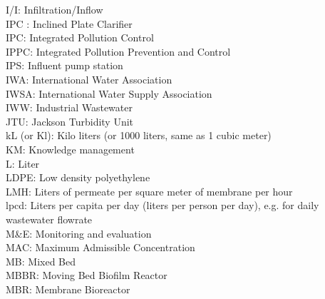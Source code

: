 \documentclass{article}
\begin{document}
I/I:  Infiltration/Inflow
\vspace{0.3cm}\\
IPC :  Inclined Plate Clarifier
\vspace{0.3cm}\\
IPC:  Integrated Pollution Control
\vspace{0.3cm}\\
IPPC:  Integrated Pollution Prevention and Control
\vspace{0.3cm}\\
IPS:  Influent pump station
\vspace{0.3cm}\\
IWA:  International Water Association
\vspace{0.3cm}\\
IWSA:  International Water Supply Association
\vspace{0.3cm}\\
IWW:  Industrial Wastewater
\vspace{0.3cm}\\
JTU:  Jackson Turbidity Unit
\vspace{0.3cm}\\
kL (or Kl):  Kilo liters (or 1000 liters, same as 1 cubic meter)
\vspace{0.3cm}\\
KM:  Knowledge management
\vspace{0.3cm}\\
L:  Liter
\vspace{0.3cm}\\
LDPE:  Low density polyethylene
\vspace{0.3cm}\\
LMH:  Liters of permeate per square meter of membrane per hour
\vspace{0.3cm}\\
lpcd:  Liters per capita per day (liters per person per day), e.g. for daily wastewater flowrate
\vspace{0.3cm}\\
M\&E:  Monitoring and evaluation
\vspace{0.3cm}\\
MAC:  Maximum Admissible Concentration
\vspace{0.3cm}\\
MB:  Mixed Bed
\vspace{0.3cm}\\
MBBR:  Moving Bed Biofilm Reactor
\vspace{0.3cm}\\
MBR:  Membrane Bioreactor
\vspace{0.3cm}\\
\end{document}
